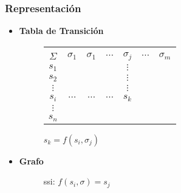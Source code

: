 \subsubsection*{Representación}
\begin{itemize}
\item \textbf{Tabla de Transición} \\

\begin{figure}[ht]
\centering
\begin{tabular}{|c|cccccc|}
    \hline
    \backslashbox{$k$}{\vspace{0.1pt}\\$\Sigma$} & $\sigma_1$ & $\sigma_1$ & $\cdots$ & $\sigma_j$ & $\cdots$ & $\sigma_m$\\ \hline
                $s_1$             &      &  &   &$\vdots$&&\\ 
                $s_2$             &      &  &  &$\vdots$&& \\ 
                $\vdots$             &      & &  & $\vdots$ &&\\ 
                $s_i$             &   $\cdots$   & $\cdots$  &$\cdots$  &$s_k$&&\\ 
                $\vdots$             &      &  &  &&& \\ 
                $s_n$             &      &  &  && &\\ \hline
\end{tabular} 
\caption{$s_k = f(s_i,\sigma_j)$}
\end{figure}
\item \textbf{Grafo} \\

\begin{figure}[ht]
\centering
{}
\caption{ssi: $f(s_i,\sigma)=s_j$}
\end{figure}
\end{itemize}
